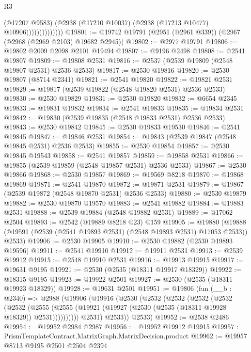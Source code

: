 \begin{lexlean}{R3}
\begin{coremodule}
                            (@17207 @9583)
                            (@2938 (@17210 @10037) (@2938 (@17213 @10477) @10906))))))))))))))
@19801 := @19742 @19791 (@2951 (@2961 @339)) (@2967 (@2968 (@2969 @2103) @19682 @2945))
@19802 := @2977 @19791
@19806 := @19802 @2009 @2098 @2101 @19494
@19807 := @9196 @2498
@19808 := @2541 @19807
@19809 := @19808 @2531
@19816 := @2537 (@2539 @19809 (@2548 @19807 @2531) @2536 @2533)
@19817 := @2530 @19816
@19820 := @2530 @19807 (@8714 @2341)
@19821 := @2541 @19820
@19822 := @19821 @2531
@19829 := @19817 (@2539 @19822 (@2548 @19820 @2531) @2536 @2533)
@19830 := @2530 @19829
@19831 := @2530 @19820
@19832 := @6654 @2345
@19833 := @19831 @19832
@19834 := @2541 @19833
@19835 := @19834 @2531
@19842 := @19830 (@2539 @19835 (@2548 @19833 @2531) @2536 @2533)
@19843 := @2530 @19842
@19845 := @2530 @19833 @19530
@19846 := @2541 @19845
@19847 := @19846 @2531
@19854 := @19843 (@2539 @19847 (@2548 @19845 @2531) @2536 @2533)
@19855 := @2530 @19854
@19857 := @2530 @19845 @19543
@19858 := @2541 @19857
@19859 := @19858 @2531
@19866 := @19855 (@2539 @19859 (@2548 @19857 @2531) @2536 @2533)
@19867 := @2530 @19866
@19868 := @2530 @19857
@19869 := @19569 @8218
@19870 := @19868 @19869
@19871 := @2541 @19870
@19872 := @19871 @2531
@19879 := @19867 (@2539 @19872 (@2548 @19870 @2531) @2536 @2533)
@19880 := @2530 @19879
@19882 := @2530 @19870 @19570
@19883 := @2541 @19882
@19884 := @19883 @2531
@19888 := @2539 @19884 (@2548 @19882 @2531)
@19889 := @17062 @2504
@19893 := @2542 (@19889 @8218 @23) @159
@19905 := @19880
    (@19888 (@19591 (@2539 (@2541 @19893 @2531) (@2548 @19893 @2531) @17053 @2533)) @2533)
@19906 := @2530 @19905
@19910 := @2530 @19882 (@2530 @19893 @19596)
@19911 := @2541 @19910
@19912 := @19911 @2531
@19913 := @2539 @19912
@19915 := @2548 @19910 @2531
@19916 := @19913 @19915
@19917 := @19631 @9195
@19921 := @2530 (@2535 (@18311 @19917 @18329))
@19922 := @18315 @9195
@19923 := @19922 @2501
@19927 := @2530 (@2535 (@18311 @19923 @18329))
@19928 := @19631 @2501
@19951 := @19806
    (fun (__b : @2340) =>
    @2988
      (@19906
        (@19916
          (@2530
            (@2532
              (@2532
                (@2532
                  (@2532
                    (@2532
                      (@2555
                        (@2555 (@19921 (@19927 (@2530 (@2535 (@18311 @19928 @18329)) @2531))))))))))
            @2531)
          @2533))
      @2533)
@19952 := @2538 @2486
@19954 := @19952 @2984 @2987
@19956 := @19952 @19912 @19915
@19957 := PrismTemplateContract.MatrixGraph.MatrixDecision.product
@19962 := @19957 @8713 @9195 @2501 @2504 @2394

\end{coremodule}
\end{lexlean}
